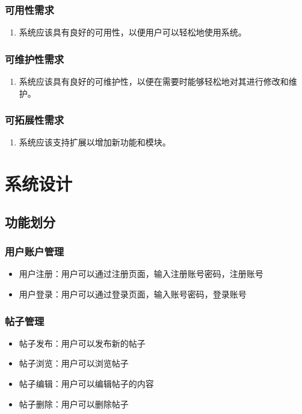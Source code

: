 \documentclass[UTF8]{ctexart}
\begin{document}
\subsubsection{可用性需求}
\begin{enumerate}
 \item 系统应该具有良好的可用性，以便用户可以轻松地使用系统。
\end{enumerate}

\subsubsection{可维护性需求}
\begin{enumerate}
  \item 系统应该具有良好的可维护性，以便在需要时能够轻松地对其进行修改和维护。
\end{enumerate}

\subsubsection{可拓展性需求}
\begin{enumerate}
  \item 系统应该支持扩展以增加新功能和模块。 
\end{enumerate}

\newpage
\section{系统设计}
\subsection{功能划分}
\subsubsection{用户账户管理}
\begin{itemize}
  \item 用户注册：用户可以通过注册页面，输入注册账号密码，注册账号
  \item 用户登录：用户可以通过登录页面，输入账号密码，登录账号
\end{itemize}

\subsubsection{帖子管理}
\begin{itemize}
  \item 帖子发布：用户可以发布新的帖子
  \item 帖子浏览：用户可以浏览帖子
  \item 帖子编辑：用户可以编辑帖子的内容
  \item 帖子删除：用户可以删除帖子
\end{itemize}
\end{document}
